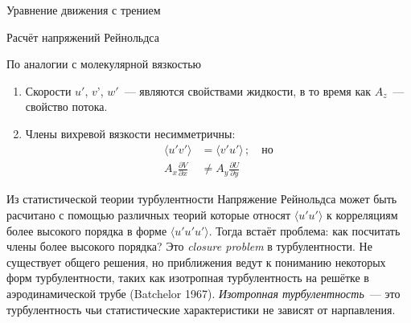 \begin{chapter}{Уравнение движения с трением}
\begin{section}{Расчёт напряжений Рейнольдса}
\begin{paragraph}{По аналогии с молекулярной вязкостью}
\begin{enumerate}
\item
Скорости $u'$, $v’$, $w'$~--- являются свойствами жидкости, в то время
как $A_z$~--- свойство потока.
%

\item
 Члены вихревой вязкости несимметричны:
\begin{align*}
\langle u'v' \rangle &= \langle v'u' \rangle\,;\quad \text{но} \\
A_x \frac{\partial{V}}{\partial{x}} &\neq A_y \frac{\partial{U}}{\partial{y}}
\end{align*}
%
\end{enumerate}
\end{paragraph}

\begin{paragraph}{Из статистической теории турбулентности}
Напряжение Рейнольдса может быть расчитано с помощью различных теорий
которые относят $\langle u'u' \rangle$ к корреляциям более высокого
порядка в форме $\langle u'u'u' \rangle$. Тогда встаёт проблема: как
посчитать члены более высокого порядка? Это \emph{closure problem} в
турбулентности. Не существует общего решения, но приближения ведут к
пониманию некоторых форм турбулентности, таких как изотропная
турбулентность на решётке в аэродинамической трубе (Batchelor
1967). \emph{Изотропная турбулентность}~--- это турбулентность чьи
статистические характеристики не зависят от нарпавления.
%


\end{paragraph}
\end{section}
\end{chapter}

